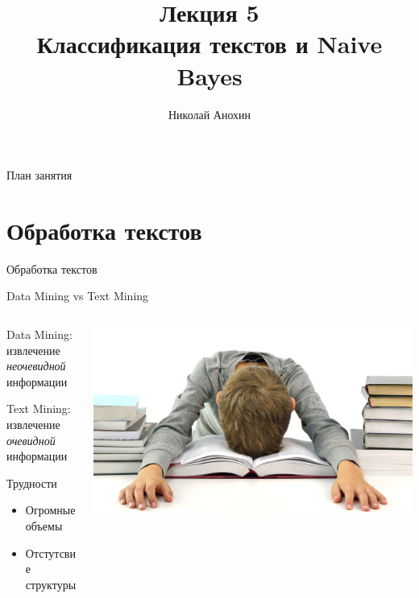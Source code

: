 \documentclass[10pt]{beamer}
\author{Николай Анохин}
\title{\newline \newline \newline Лекция 5 \\ Классификация текстов и Naive Bayes}
\let\otp\titlepage
\renewcommand{\titlepage}{\otp\addtocounter{framenumber}{-1}}
\begin{document}
\begin{frame}[plain]
\titlepage
\end{frame}

\begin{frame}{План занятия}
\tableofcontents
\end{frame}


\section{Обработка текстов}


\begin{frame}{}

\begin{center}
\Large Обработка текстов
\end{center}

\end{frame}

\begin{frame}{Data Mining vs Text Mining}

	\begin{columns}[T]
    \begin{column}{.5\textwidth}
   	Data Mining: \\ извлечение {\it неочевидной} информации

	\vspace{1em}
	Text Mining: \\ извлечение {\it очевидной} информации

\vspace{1em}
Трудности
\begin{itemize}
\item Огромные объемы
\item Отстутсвие структуры
\end{itemize}
	    
    \end{column}
    \begin{column}{.5\textwidth}
    \vspace{1em}
    \includegraphics[scale=0.06]{images/books.jpg}    
    \end{column}
  \end{columns}

\end{frame}
\end{document}
